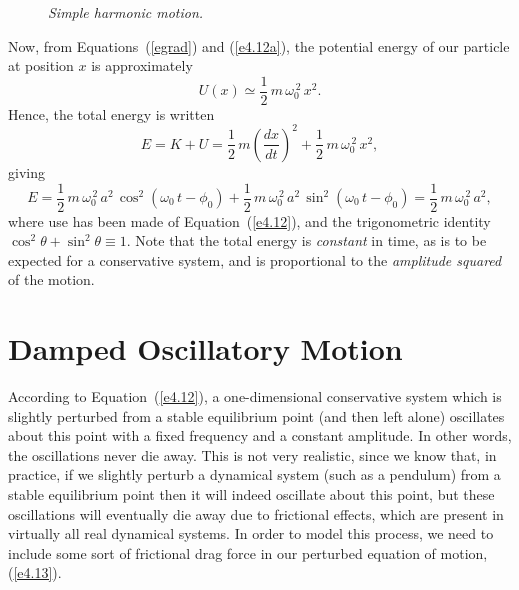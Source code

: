 \begin{figure}
\epsfysize=2.5in
\centerline{}
\caption{\em Simple harmonic motion.}\label{fshm}   
\end{figure}

Now, from Equations~(\ref{egrad}) and (\ref{e4.12a}), the potential
energy of our particle at position $x$ is approximately
\begin{equation}
U(x) \simeq \frac{1}{2}\,m\,\omega_0^{\,2}\,x^2.
\end{equation}
Hence, the total energy is written
\begin{equation}
E = K + U = \frac{1}{2}\,m\left(\frac{dx}{dt}\right)^2+  \frac{1}{2}\,m\,\omega_0^{\,2}\,x^2,
\end{equation}
giving
\begin{equation}\label{e4.37x}
E = \frac{1}{2}\,m\,\omega_0^{\,2}\,a^2\,\cos^2(\omega_0\,t-\phi_0)
+ \frac{1}{2}\,m\,\omega_0^{\,2}\,a^2\,\sin^2(\omega_0\,t-\phi_0)
= \frac{1}{2}\,m\,\omega_0^{\,2}\,a^2,
\end{equation}
where use has been made of Equation~(\ref{e4.12}), and the trigonometric
identity $\cos^2\theta+\sin^2\theta \equiv 1$. Note that the
total energy is {\em constant}\/ in time, as is to be expected for a
conservative system, and is proportional to the {\em amplitude squared}\/
of the motion.

\section{Damped Oscillatory Motion}\label{s4.4}
According to Equation~(\ref{e4.12}), a one-dimensional conservative system which is
slightly perturbed from a stable equilibrium point (and then left alone) oscillates about this
point with a fixed frequency and a constant amplitude. In other words,
the oscillations never die away. This is not very realistic, since we
know that, in practice, if we slightly perturb a  dynamical system (such as a
pendulum) from a stable equilibrium point then it will indeed oscillate about this point,
but  these oscillations will  eventually die away due to frictional effects,
which are present in virtually all real dynamical systems. In order to model
this process, we need to include some sort of frictional drag force in
our perturbed equation of motion, (\ref{e4.13}).

